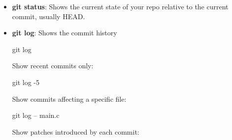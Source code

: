 \documentclass{report}
\begin{document}
\begin{itemize}
\begin{bashcode}
            \end{bashcode}
            \bigbreak \noindent 
            Shows untracked files
            \bigbreak \noindent 
            \begin{bashcode}
                git ls-files --others --exclude-standard
            \end{bashcode}
            \bigbreak \noindent 
            Shows untracked files, but respect .gitignore.
            \bigbreak \noindent 
            \begin{bashcode}
                git ls-files --ignored --others --exclude-standard
            \end{bashcode}
            \bigbreak \noindent 
            \begin{bashcode}
                git ls-files --deleted
            \end{bashcode}
            \bigbreak \noindent 
            Shows deleted tracked files
            \bigbreak \noindent 
            \begin{bashcode}
                git ls-files --modified
            \end{bashcode}
            \bigbreak \noindent 
            Shows modified tracked files
            \bigbreak \noindent 
            \begin{bashcode}
                git ls-files --unmerged
            \end{bashcode}
            \bigbreak \noindent 
            Shows files with merge conflicts.
        \item \textbf{git status}: Shows the current state of your repo relative to the current commit, usually HEAD.
        \item \textbf{git log}: Shows the commit history
            \bigbreak \noindent 
            \begin{bashcode}
                git log
            \end{bashcode}
            \bigbreak \noindent 
            Show recent commits only:
            \bigbreak \noindent 
            \begin{bashcode}
                git log -5
            \end{bashcode}
            \bigbreak \noindent 
            Show commits affecting a specific file:
            \bigbreak \noindent 
            \begin{bashcode}
                git log -- main.c
            \end{bashcode}
            \bigbreak \noindent 
            Show patches introduced by each commit:

\end{itemize}
\end{document}
